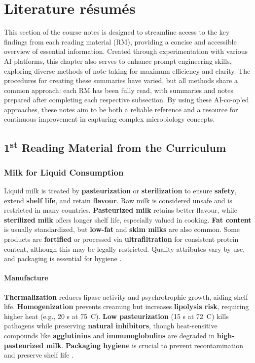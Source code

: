 \chapter{Literature résumés}
\setlength{\headheight}{12.71342pt}
\addtolength{\topmargin}{-0.71342pt}

This section of the course notes is designed to streamline access to the key findings from each reading material (RM), providing a concise and accessible overview of essential information. Created through experimentation with various AI platforms, this chapter also serves to enhance prompt engineering skills, exploring diverse methods of note-taking for maximum efficiency and clarity. The procedures for creating these summaries have varied, but all methods share a common approach: each RM has been fully read, with summaries and notes prepared after completing each respective subsection. By using these AI-co-op'ed approaches, these notes aim to be both a reliable reference and a resource for continuous improvement in capturing complex microbiology concepts.

\section{1\texorpdfstring{\textsuperscript{st}}{st} Reading Material from the Curriculum}

\subsection{Milk for Liquid Consumption}
Liquid milk is treated by \textbf{pasteurization} or \textbf{sterilization} to ensure \textbf{safety}, extend \textbf{shelf life}, and retain \textbf{flavour}. Raw milk is considered unsafe and is restricted in many countries. \textbf{Pasteurized milk} retains better flavour, while \textbf{sterilized milk} offers longer shelf life, especially valued in cooking. \textbf{Fat content} is usually standardized, but \textbf{low-fat} and \textbf{skim milks} are also common. Some products are \textbf{fortified} or processed via \textbf{ultrafiltration} for consistent protein content, although this may be legally restricted. Quality attributes vary by use, and packaging is essential for hygiene \cite*{curr_rm_01_dairy_science_technology}.

\subsubsection*{Manufacture}
\textbf{Thermalization} reduces lipase activity and psychrotrophic growth, aiding shelf life. \textbf{Homogenization} prevents creaming but increases \textbf{lipolysis risk}, requiring higher heat (e.g., 20 s at 75~\textdegree C). \textbf{Low pasteurization} (15 s at 72~\textdegree C) kills pathogens while preserving \textbf{natural inhibitors}, though heat-sensitive compounds like \textbf{agglutinins} and \textbf{immunoglobulins} are degraded in \textbf{high-pasteurized milk}. \textbf{Packaging hygiene} is crucial to prevent recontamination and preserve shelf life \cite*{curr_rm_01_dairy_science_technology}.



